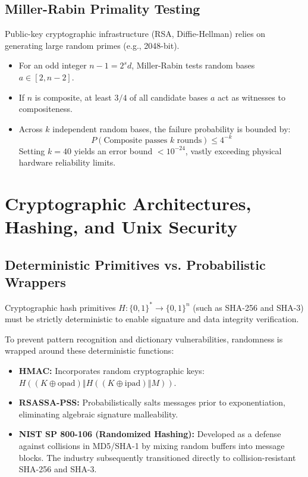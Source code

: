 \documentclass[11pt,a4paper]{article}
\begin{document}
\subsection{Miller-Rabin Primality Testing}
Public-key cryptographic infrastructure (RSA, Diffie-Hellman) relies on generating large random primes (e.g., 2048-bit).
\begin{itemize}
    \item For an odd integer $n - 1 = 2^s d$, Miller-Rabin tests random bases $a \in [2, n-2]$.
    \item If $n$ is composite, at least $3/4$ of all candidate bases $a$ act as witnesses to compositeness.
    \item Across $k$ independent random bases, the failure probability is bounded by:
    \begin{equation}
    P(\text{Composite passes } k \text{ rounds}) \le 4^{-k}
    \end{equation}
    Setting $k = 40$ yields an error bound $< 10^{-24}$, vastly exceeding physical hardware reliability limits.
\end{itemize}

\section{Cryptographic Architectures, Hashing, and Unix Security}

\subsection{Deterministic Primitives vs. Probabilistic Wrappers}
Cryptographic hash primitives $H: \{0, 1\}^* \to \{0, 1\}^n$ (such as SHA-256 and SHA-3) must be strictly deterministic to enable signature and data integrity verification.

To prevent pattern recognition and dictionary vulnerabilities, randomness is wrapped around these deterministic functions:
\begin{itemize}
    \item \textbf{HMAC:} Incorporates random cryptographic keys: $H((K \oplus \text{opad}) \mathbin{\Vert} H((K \oplus \text{ipad}) \mathbin{\Vert} M))$.
    \item \textbf{RSASSA-PSS:} Probabilistically salts messages prior to exponentiation, eliminating algebraic signature malleability.
    \item \textbf{NIST SP 800-106 (Randomized Hashing):} Developed as a defense against collisions in MD5/SHA-1 by mixing random buffers into message blocks. The industry subsequently transitioned directly to collision-resistant SHA-256 and SHA-3.
\end{itemize}
\end{document}
